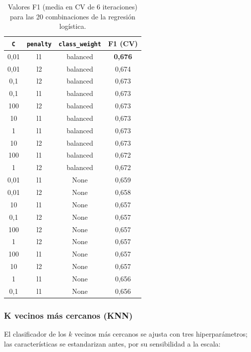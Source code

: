 \documentclass[12pt,a4paper]{report}
\theoremstyle{definition}
\newcommand{\tc}[1]{\texttt{#1}}
\begin{document}
\begin{table}[H]
\centering\footnotesize
\begin{tabular}{cccc}
\toprule
\tc{C} & \tc{penalty} & \tc{class\_weight} & F1 (CV) \\
\midrule
0,01 & l1 & balanced & \textbf{0,676} \\
0,01 & l2 & balanced & 0,674 \\
0,1 & l2 & balanced & 0,673 \\
0,1 & l1 & balanced & 0,673 \\
100 & l2 & balanced & 0,673 \\
10 & l1 & balanced & 0,673 \\
1 & l1 & balanced & 0,673 \\
10 & l2 & balanced & 0,673 \\
100 & l1 & balanced & 0,672 \\
1 & l2 & balanced & 0,672 \\
0,01 & l1 & None & 0,659 \\
0,01 & l2 & None & 0,658 \\
10 & l1 & None & 0,657 \\
0,1 & l2 & None & 0,657 \\
100 & l2 & None & 0,657 \\
1 & l2 & None & 0,657 \\
100 & l1 & None & 0,657 \\
10 & l2 & None & 0,657 \\
1 & l1 & None & 0,656 \\
0,1 & l1 & None & 0,656 \\
\bottomrule
\end{tabular}
\caption{Valores F1 (media en CV de 6 iteraciones) para las 20 combinaciones de la regresión
logística.}
\label{tab:grid-lr}
\end{table}

\subsubsection{K vecinos más cercanos (KNN)}

El clasificador de los $k$ vecinos más cercanos se ajusta con tres hiperparámetros; las
características se estandarizan antes, por su sensibilidad a la escala:
\end{document}
